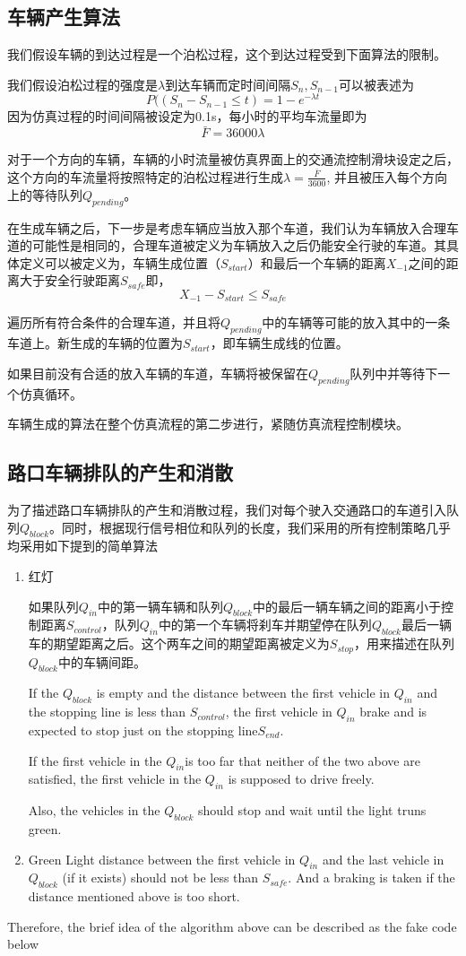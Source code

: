 \documentclass[a4paper,UTF8]{paper}
\begin{document}
\subsection{车辆产生算法}
我们假设车辆的到达过程是一个泊松过程，这个到达过程受到下面算法的限制。

我们假设泊松过程的强度是$\lambda$到达车辆而定时间间隔$S_n,S_{n-1}$可以被表述为 
$$P((S_n-S_{n-1}\le t) = 1 - e^{-\lambda t}$$
因为仿真过程的时间间隔被设定为0.1s，每小时的平均车流量即为$$\bar{F}=36000\lambda$$

对于一个方向的车辆，车辆的小时流量被仿真界面上的交通流控制滑块设定之后，这个方向的车流量将按照特定的泊松过程进行生成$\lambda=\displaystyle{\frac{\bar{F}}{3600}}$, 并且被压入每个方向上的等待队列$Q_{pending}$。

在生成车辆之后，下一步是考虑车辆应当放入那个车道，我们认为车辆放入合理车道的可能性是相同的，合理车道被定义为车辆放入之后仍能安全行驶的车道。其具体定义可以被定义为，车辆生成位置（$S_{start}$）和最后一个车辆的距离$X_{-1}$之间的距离大于安全行驶距离$S_{safe}$即，$$X_{-1}-S_{start}\le S_{safe}$$

遍历所有符合条件的合理车道，并且将$Q_{pending}$中的车辆等可能的放入其中的一条车道上。新生成的车辆的位置为$S_{start}$，即车辆生成线的位置。

如果目前没有合适的放入车辆的车道，车辆将被保留在$Q_{pending}$队列中并等待下一个仿真循环。

车辆生成的算法在整个仿真流程的第二步进行，紧随仿真流程控制模块。
\subsection{路口车辆排队的产生和消散}
\label{section:feq}
为了描述路口车辆排队的产生和消散过程，我们对每个驶入交通路口的车道引入队列$Q_{block}$。同时，根据现行信号相位和队列的长度，我们采用的所有控制策略几乎均采用如下提到的简单算法
\begin{enumerate}
\item 红灯

如果队列$Q_{in}$中的第一辆车辆和队列$Q_{block}$中的最后一辆车辆之间的距离小于控制距离$S_{control}$，队列$Q_{in}$中的第一个车辆将刹车并期望停在队列$Q_{block}$最后一辆车的期望距离之后。这个两车之间的期望距离被定义为$S_{stop}$，用来描述在队列$Q_{block}$中的车辆间距。 

If the $Q_{block}$ is empty and the distance between the first vehicle in $Q_{in}$ and the stopping line is less than $S_{control}$, the first vehicle in $Q_{in}$ brake and is expected to stop just on the stopping line$S_{end}$.

If the first vehicle in the $Q_{in}$is too far that neither of the two above are satisfied, the first vehicle in the $Q_{in}$ is supposed to drive freely.

Also, the vehicles in the $Q_{block}$ should stop and wait until the light truns green.
\item Green Light
distance between the first vehicle in $Q_{in}$ and the last vehicle in $Q_{block}$ (if it exists) should not be less than $S_{safe}$. And a braking is taken if the distance mentioned above is too short.
\end{enumerate}
Therefore, the brief idea of the algorithm above can be described as the fake code below\\ 
\end{document}
